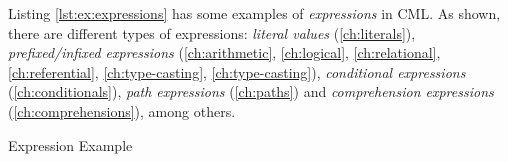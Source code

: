 Listing \ref{lst:ex:expressions} has some examples of \emph{expressions} in CML.
As shown, there are different types of expressions:
\emph{literal values} (\ref{ch:literals}),
\emph{prefixed/infixed expressions}
(\ref{ch:arithmetic}, \ref{ch:logical}, \ref{ch:relational}, \ref{ch:referential},
\ref{ch:type-casting}, \ref{ch:type-casting}),
\emph{conditional expressions} (\ref{ch:conditionals}),
\emph{path expressions} (\ref{ch:paths})
and \emph{comprehension expressions} (\ref{ch:comprehensions}),
among others.

\begin{code}[H]
\verbatimfont{\small}

\caption{Expression Example}
\label{lst:ex:expressions}
\end{code}
